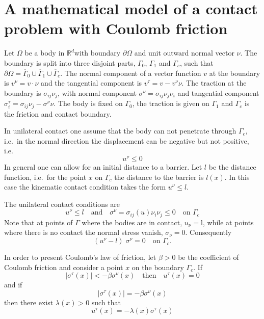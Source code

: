 \documentclass[12pt,a4paper]{article}
\numberwithin{equation}{section}
\numberwithin{table}{section}
\numberwithin{figure}{section}
\newcommand{\R}{\ensuremath{\mathbb{R}}}
\newcommand{\Rd}{\ensuremath{\R^d}}
\newcommand{\dOmega}{{\partial\Omega}}
\newcommand{\stress}[1][]{\ensuremath{\sigma_{#1}}}
\newcommand{\sigij}{\stress[ij]}
\providecommand{\abs}[1]{\lvert #1 \rvert}
\begin{document}
\section{A mathematical model of a contact problem with Coulomb friction}
\label{sec:math-model-cont}

Let $\Omega$ be a body in \Rd with boundary $\dOmega$ and unit outward normal vector
$\nu$.  The boundary is split into three disjoint parts, $\Gamma_0$, $\Gamma_1$ and
$\Gamma_c$, such that $\dOmega = \overline{\Gamma}_0 \cup \overline{\Gamma}_1 \cup
\overline{\Gamma}_c$.  The normal component of a vector function $v$ at the boundary is
$v^\nu = v\cdot\nu$ and the tangential component is $v^\tau = v - v^\nu \nu$.  The
traction at the boundary is $\sigij\nu_j$, with normal component $\sigma^\nu =
\sigij\nu_j\nu_i$ and tangential component $\sigma_i^\tau = \sigij\nu_j - \sigma^\nu \nu$.
The body is fixed on $\Gamma_0$, the traction is given on $\Gamma_1$ and $\Gamma_c$ is the
friction and contact boundary.

In unilateral contact one assume that the body can not penetrate
through $\Gamma_c$, i.e.\ in the normal direction the displacement can
be negative but not positive, i.e.\
\begin{equation}
  u^\nu \le 0
\end{equation}
In general one can allow for an initial distance to a barrier. Let $l$
be the distance function, i.e.\ for the point $x$ on $\Gamma_c$ the
distance to the barrier is $l(x)$.  In this case the kinematic contact
condition takes the form $u^\nu \le l$.

The unilateral contact conditions are
\begin{equation}
  \label{eq:contact}
  u^\nu \le l \quad\text{and}\quad \sigma^\nu = \sigij(u)\nu_i \nu_j \le 0
  \quad\text{on }\Gamma_c
\end{equation}
Note that at points of $\Gamma$ where the bodies are in contact, $u_\nu=$l, while at
points where there is no contact the normal stress vanish, $\sigma_\nu = 0$.
Consequently
\begin{equation}
  \label{eq:7}
  (u^\nu - l) \;\sigma^\nu = 0 \quad\text{on }\Gamma_c.
\end{equation}

In order to present Coulomb's law of friction, let $\beta>0$ be the coefficient of Coulomb
friction and consider a point $x$ on the boundary $\Gamma_c$.  If
\begin{equation}
  \label{eq:9}
  \abs{\sigma^\tau(x)} < -\beta \sigma^\nu(x) \quad\text{then}\quad
  u^\tau(x) = 0
\end{equation}
and if
\begin{equation}
  \label{eq:10}
  \abs{\sigma^\tau(x)} = -\beta \sigma^\nu(x)
\end{equation}
then there exist $\lambda(x)>0$ such that
\begin{equation}
  u^\tau(x) = -\lambda(x) \sigma^\tau(x)
\end{equation}
\end{document}
